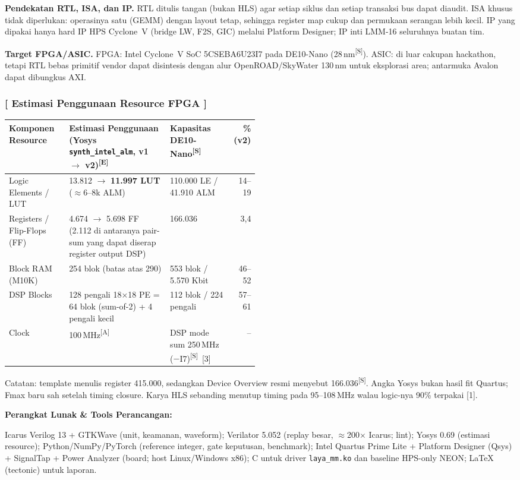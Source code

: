 \documentclass[10pt]{article}
\newcommand{\hd}[1]{\cellcolor{thg}\textbf{#1}}
\newcommand{\code}[1]{\texttt{\small #1}}
\newcommand{\lbl}[1]{\textbf{#1}\par}
\newcommand{\Sx}{\textsuperscript{[S]}}
\newcommand{\E}{\textsuperscript{[E]}}
\newcommand{\A}{\textsuperscript{[A]}}
\begin{document}
\textbf{Pendekatan RTL, ISA, dan IP.} RTL ditulis tangan (bukan HLS) agar setiap siklus dan setiap transaksi bus dapat diaudit. ISA khusus tidak diperlukan: operasinya satu (GEMM) dengan layout tetap, sehingga register map cukup dan permukaan serangan lebih kecil. IP yang dipakai hanya hard IP HPS Cyclone~V (bridge LW, F2S, GIC) melalui Platform Designer; IP inti LMM-16 seluruhnya buatan tim.

\textbf{Target FPGA/ASIC.} FPGA: Intel Cyclone~V SoC 5CSEBA6U23I7 pada DE10-Nano (28\,nm\Sx). ASIC: di luar cakupan hackathon, tetapi RTL bebas primitif vendor dapat disintesis dengan alur OpenROAD/SkyWater 130\,nm untuk eksplorasi area; antarmuka Avalon dapat dibungkus AXI.

\subsubsection{[ Estimasi Penggunaan Resource FPGA ]}

{\small
\begin{tabularx}{\linewidth}{|p{0.24\linewidth}|L|p{0.25\linewidth}|r|}
\hline
\hd{Komponen Resource} & \hd{Estimasi Penggunaan (Yosys \code{synth\_intel\_alm}, v1 $\rightarrow$ v2)\E} & \hd{Kapasitas DE10-Nano\Sx} & \hd{\% (v2)} \\ \hline
Logic Elements / LUT & 13.812 $\rightarrow$ \textbf{11.997 LUT} ($\approx$6--8k ALM) & 110.000 LE / 41.910 ALM & 14--19 \\ \hline
Registers / Flip-Flops (FF) & 4.674 $\rightarrow$ 5.698 FF (2.112 di antaranya pair-sum yang dapat diserap register output DSP) & 166.036 & 3,4 \\ \hline
Block RAM (M10K) & 254 blok (batas atas 290) & 553 blok / 5.570 Kbit & 46--52 \\ \hline
DSP Blocks & 128 pengali 18$\times$18 PE = 64 blok (sum-of-2) + 4 pengali kecil & 112 blok / 224 pengali & 57--61 \\ \hline
Clock & 100\,MHz\A & DSP mode sum 250\,MHz ($-$I7)\Sx~[3] & -- \\ \hline
\end{tabularx}}
Catatan: template menulis register 415.000, sedangkan Device Overview resmi menyebut 166.036\Sx. Angka Yosys bukan hasil fit Quartus; Fmax baru sah setelah timing closure. Karya HLS sebanding menutup timing pada 95--108\,MHz walau logic-nya 90\% terpakai [1].

\lbl{Perangkat Lunak \& Tools Perancangan:}
Icarus Verilog 13 + GTKWave (unit, keamanan, waveform); Verilator 5.052 (replay besar, $\approx$200$\times$ Icarus; lint); Yosys 0.69 (estimasi resource); Python/NumPy/PyTorch (reference integer, gate keputusan, benchmark); Intel Quartus Prime Lite + Platform Designer (Qsys) + SignalTap + Power Analyzer (board; host Linux/Windows x86); C untuk driver \code{laya\_mm.ko} dan baseline HPS-only NEON; \LaTeX{} (tectonic) untuk laporan.
\end{document}
